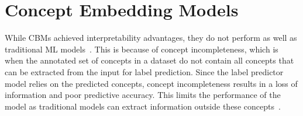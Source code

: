 
\section{Concept Embedding Models}\label{background:cem}

While CBMs achieved
interpretability advantages, they do not perform as well as traditional ML models~\cite{cbm}. 
This is because of concept incompleteness,
which is when the annotated set of concepts in a dataset do not contain all concepts that can be extracted from the input for label prediction. Since the label predictor model
relies on the predicted concepts, concept incompleteness results in a loss of information and poor predictive accuracy.
This limits
the performance of the model as traditional models can extract
information outside these concepts~\cite{cbm-hybrid}. 


